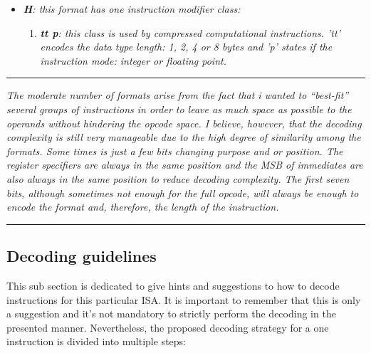 \documentclass{article}
\begin{document}
\begin{itemize}
\begin{enumerate}
                    \end{enumerate}

                \item \textit{\textbf{H}: this format has one instruction modifier class:}

                    \begin{enumerate}

                        \item \textit{\textbf{tt p}: this class is used by compressed computational instructions. 'tt' encodes the data type length: 1, 2, 4 or 8 bytes and 'p' states if the instruction mode: integer or floating point.}

                    \end{enumerate}

            \end{itemize}

        \par\noindent\rule{\textwidth}{0.4pt}
        \textit{The moderate number of formats arise from the fact that i wanted to ``best-fit'' several groups of instructions in order to leave as much space as possible to the operands without hindering the opcode space. I believe, however, that the decoding complexity is still very manageable due to the high degree of similarity among the formats. Some times is just a few bits changing purpose and or position. The register specifiers are always in the same position and the MSB of immediates are also always in the same position to reduce decoding complexity. The first seven bits, although sometimes not enough for the full opcode, will always be enough to encode the format and, therefore, the length of the instruction.}
        \par\noindent\rule{\textwidth}{0.4pt}

        \subsection{Decoding guidelines}    %

            \vspace{10pt}

            This sub section is dedicated to give hints and suggestions to how to decode instructions for this particular ISA. It is important to remember that this is only a suggestion and it's not mandatory to strictly perform the decoding in the presented manner. Nevertheless, the proposed decoding strategy for a one instruction is divided into multiple steps:
\end{document}
